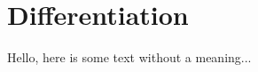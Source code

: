 \documentclass[../main.tex]{subfiles}
\begin{document}
\section{Differentiation}

Hello, here is some text without a meaning...
\end{document}
